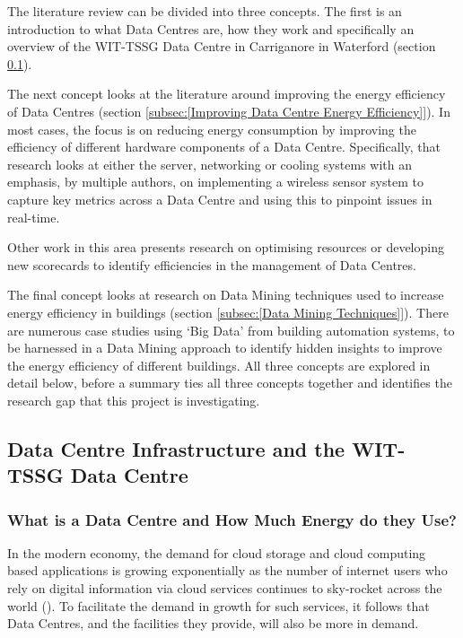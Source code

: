 \documentclass[12pt]{scrartcl}
\begin{document}
The literature review can be divided into three concepts. The first is an introduction to what Data Centres are, how they work and specifically an overview of the WIT-TSSG Data Centre in Carriganore in Waterford (section \ref{subsec:[Data Centre Infrastructure and the WIT-TSSG Data Centre]}).  

The next concept looks at the literature around improving the energy efficiency of Data Centres (section \ref{subsec:[Improving Data Centre Energy Efficiency]}). In most cases, the focus is on reducing energy consumption by improving the efficiency of different hardware components of a Data Centre. Specifically, that research looks at either the server, networking or cooling systems with an emphasis, by multiple authors, on implementing a wireless sensor system to capture key metrics across a Data Centre and using this to pinpoint issues in real-time. 

Other work in this area presents research on optimising resources or developing new scorecards to identify efficiencies in the management of Data Centres. 

The final concept looks at research on Data Mining techniques used to increase energy efficiency in buildings (section \ref{subsec:[Data Mining Techniques]}). There are numerous case studies using `Big Data' from building automation systems, to be harnessed in a Data Mining approach to identify hidden insights to improve the energy efficiency of different buildings. All three concepts are explored in detail below, before a summary ties all three concepts together and identifies the research gap that this project is investigating.        

\subsection{Data Centre Infrastructure and the WIT-TSSG Data Centre}
\label{subsec:[Data Centre Infrastructure and the WIT-TSSG Data Centre]}

\subsubsection{What is a Data Centre and How Much Energy do they Use?}
\label{subsubsec:[What is a Data Centre and How Much Energy do they Use?]}

In the modern economy, the demand for cloud storage and cloud computing based applications is growing exponentially as the number of internet users who rely on digital information via cloud services continues to sky-rocket across the world (\citep{VASUDEVAN201794}). To facilitate the demand in growth for such services, it follows that Data Centres, and the facilities they provide, will also be more in demand.  
\end{document}
